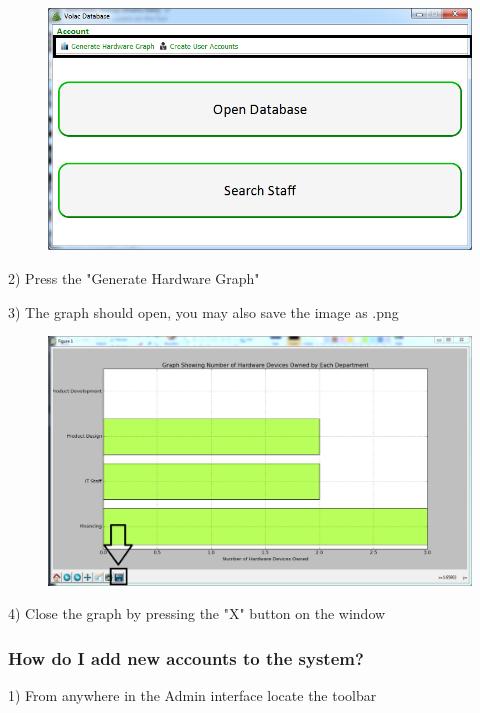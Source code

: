 \begin{figure}[H]
    \includegraphics[width=\textwidth]{./Manual/Images/graph1.png}
\end{figure}

2) Press the "Generate Hardware Graph"

3) The graph should open, you may also save the image as .png

\begin{figure}[H]
    \includegraphics[width=\textwidth]{./Manual/Images/graph2.png}
\end{figure}

4) Close the graph by pressing the "X" button on the window

\subsubsection{How do I add new accounts to the system?}\label{accountcreate}

1) From anywhere in the Admin interface locate the toolbar

